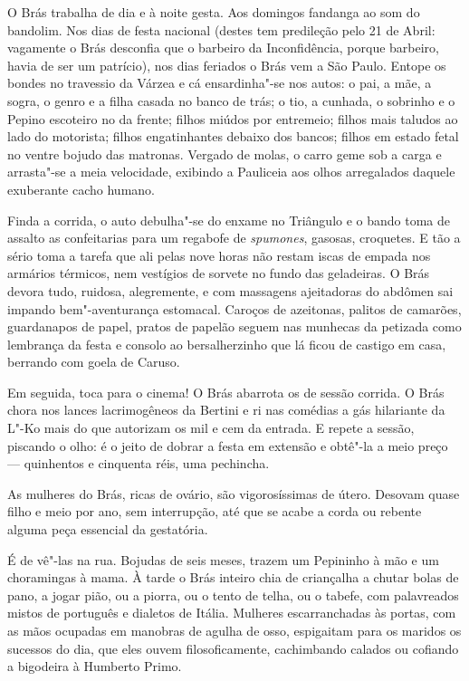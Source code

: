 O Brás trabalha de dia e à noite gesta. Aos domingos fandanga ao som do
bandolim. Nos dias de festa nacional (destes tem predileção pelo 21 de
Abril: vagamente o Brás desconfia que o barbeiro da Inconfidência,
porque barbeiro, havia de ser um patrício), nos dias feriados o Brás vem
a São Paulo. Entope os bondes no travessio da Várzea e cá ensardinha"-se
nos autos: o pai, a mãe, a sogra, o genro e a filha casada no banco de
trás; o tio, a cunhada, o sobrinho e o Pepino escoteiro no da frente;
filhos miúdos por entremeio; filhos mais taludos ao lado do motorista;
filhos engatinhantes debaixo dos bancos; filhos em estado fetal no
ventre bojudo das matronas. Vergado de molas, o carro geme sob a carga e
arrasta"-se a meia velocidade, exibindo a Pauliceia aos olhos arregalados
daquele exuberante cacho humano.

Finda a corrida, o auto debulha"-se do enxame no Triângulo e o bando toma
de assalto as confeitarias para um regabofe de \emph{spumones}, gasosas,
croquetes. E tão a sério toma a tarefa que ali pelas nove horas não
restam iscas de empada nos armários térmicos, nem vestígios de sorvete
no fundo das geladeiras. O Brás devora tudo, ruidosa, alegremente, e com
massagens ajeitadoras do abdômen sai impando bem"-aventurança estomacal.
Caroços de azeitonas, palitos de camarões, guardanapos de papel, pratos
de papelão seguem nas munhecas da petizada como lembrança da festa e
consolo ao bersalherzinho que lá ficou de castigo em casa, berrando com
goela de Caruso.

Em seguida, toca para o cinema! O Brás abarrota os de sessão corrida. O
Brás chora nos lances lacrimogêneos da Bertini e ri nas comédias a gás
hilariante da L"-Ko mais do que autorizam os mil e cem da entrada. E
repete a sessão, piscando o olho: é o jeito de dobrar a festa em
extensão e obtê"-la a meio preço --- quinhentos e cinquenta réis, uma
pechincha.

As mulheres do Brás, ricas de ovário, são vigorosíssimas de útero.
Desovam quase filho e meio por ano, sem interrupção, até que se acabe a
corda ou rebente alguma peça essencial da gestatória.

É de vê"-las na rua. Bojudas de seis meses, trazem um Pepininho à mão e
um choramingas à mama. À tarde o Brás inteiro chia de criançalha a
chutar bolas de pano, a jogar pião, ou a piorra, ou o tento de telha, ou
o tabefe, com palavreados mistos de português e dialetos de Itália.
Mulheres escarranchadas às portas, com as mãos ocupadas em manobras de
agulha de osso, espigaitam para os maridos os sucessos do dia, que eles
ouvem filosoficamente, cachimbando calados ou cofiando a bigodeira à
Humberto Primo.

